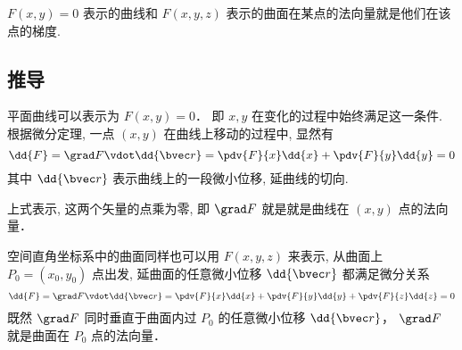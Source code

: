 

$F(x, y) = 0$ 表示的曲线和 $F(x, y, z)$ 表示的曲面在某点的法向量就是他们在该点的梯度.

\subsection{推导}

平面曲线可以表示为 $F(x, y) = 0$． 即 $x, y$ 在变化的过程中始终满足这一条件. 根据微分定理, 一点 $(x, y)$ 在曲线上移动的过程中, 显然有
\begin{equation}
\dd{F} = \grad F \vdot \dd{\bvec r} = \pdv{F}{x} \dd{x} + \pdv{F}{y} \dd{y} = 0
\end{equation}
其中 $\dd{\bvec r}$ 表示曲线上的一段微小位移, 延曲线的切向.

上式表示, 这两个矢量的点乘为零, 即 $\grad F$ 就是就是曲线在 $(x,y)$ 点的法向量．

空间直角坐标系中的曲面同样也可以用 $F(x, y, z)$ 来表示, 从曲面上 $P_0 = (x_0, y_0)$ 点出发, 延曲面的任意微小位移 $\dd{\bvec r}$ 都满足微分关系
\begin{equation}
\dd{F} = \grad F \vdot \dd{\bvec r} = \pdv{F}{x} \dd{x} + \pdv{F}{y} \dd{y} + \pdv{F}{z} \dd{z} = 0
\end{equation}
既然 $\grad F$ 同时垂直于曲面内过 $P_0$ 的任意微小位移 $\dd{\bvec r}$， $\grad F$ 就是曲面在 $P_0$ 点的法向量．

